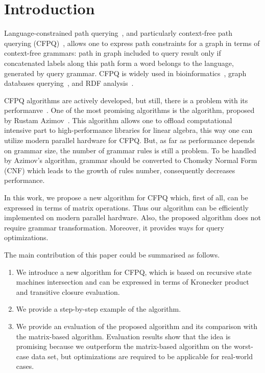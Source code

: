 \section{Introduction}

Language-constrained path querying~\cite{doi:10.1137/S0097539798337716}, and particularly context-free path querying (CFPQ)~\cite{Yannakakis}, allows one to express path constraints for a graph in terms of context-free grammars: path in graph  included to query result only if concatenated labels along this path form a word belongs to the language, generated by query grammar. CFPQ is widely used in bioinformatics~\cite{GraphQueryWithEarley}, graph databases querying~\cite{hellings2015querying,Medeiros:2018:EEC:3167132.3167265,10.1145/3335783.3335791}, and RDF analysis~\cite{RDF}. 

CFPQ algorithms are actively developed, but still, there is a problem with its performanve~\cite{10.1145/3335783.3335791}.
One of the most promising algorithms is the algorithm, proposed by Rustam Azimov~\cite{Azimov:2018:CPQ:3210259.3210264}. 
This algorithm allows one to offload computational intensive part to high-performance libraries for linear algebra, this way one can utilize modern parallel hardware for CFPQ.
But, as far as performance depends on grammar size, the number of grammar rules  is still a problem. To be handled by Azimov's algorithm, grammar should be converted to Chomsky Normal Form (CNF) which leads to the growth of rules number, consequently decreases performance. 

In this work, we propose a new algorithm for CFPQ which, first of all, can be expressed in terms of matrix operations. Thus our algorithm can be efficiently implemented on modern parallel hardware. Also, the proposed algorithm does not require grammar transformation.  Moreover, it provides ways for query optimizations.


The main contribution of this paper could be summarised as follows.

\begin{enumerate}
\item We introduce a new algorithm for CFPQ, which is based on recursive state machines intersection and can be expressed in terms of Kronecker product and transitive closure evaluation.
\item We provide a step-by-step example of the algorithm.
\item We provide an evaluation of the proposed algorithm and its comparison with the matrix-based algorithm. Evaluation results show that the idea is promising because we outperform the matrix-based algorithm on the worst-case data set, but optimizations are required to be applicable for real-world cases.
\end{enumerate}

